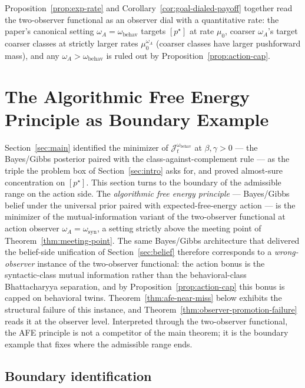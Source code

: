 \documentclass[11pt]{article}
\theoremstyle{definition}
\theoremstyle{remark}
\begin{document}
Proposition~\ref{prop:exp-rate} and Corollary~\ref{cor:goal-dialed-payoff} together read the two-observer functional as an observer dial with a quantitative rate: the paper's canonical setting $\omega_A=\omega_{\mathrm{behav}}$ targets $[p^\star]$ at rate $\mu_0$, coarser $\omega_A$'s target coarser classes at strictly larger rates $\mu_0^{\omega_A}$ (coarser classes have larger pushforward mass), and any $\omega_A>\omega_{\mathrm{behav}}$ is ruled out by Proposition~\ref{prop:action-cap}.

\section{The Algorithmic Free Energy Principle as Boundary Example}
\label{sec:boundary-example}
\label{sec:near-miss}

Section~\ref{sec:main} identified the minimizer of $\mathcal J_t^{\omega_{\mathrm{behav}}}$ at $\beta,\gamma>0$ --- the Bayes/Gibbs posterior paired with the class-against-complement rule --- as the triple the problem box of Section~\ref{sec:intro} asks for, and proved almost-sure concentration on $[p^\star]$. This section turns to the boundary of the admissible range on the action side. The \emph{algorithmic free energy principle} --- Bayes/Gibbs belief under the universal prior paired with expected-free-energy action --- is the minimizer of the mutual-information variant of the two-observer functional at action observer $\omega_A=\omega_{\mathrm{syn}}$, a setting strictly above the meeting point of Theorem~\ref{thm:meeting-point}. The same Bayes/Gibbs architecture that delivered the belief-side unification of Section~\ref{sec:belief} therefore corresponds to a \emph{wrong-observer} instance of the two-observer functional: the action bonus is the syntactic-class mutual information rather than the behavioral-class Bhattacharyya separation, and by Proposition~\ref{prop:action-cap} this bonus is capped on behavioral twins. Theorem~\ref{thm:afe-near-miss} below exhibits the structural failure of this instance, and Theorem~\ref{thm:observer-promotion-failure} reads it at the observer level. Interpreted through the two-observer functional, the AFE principle is not a competitor of the main theorem; it is the boundary example that fixes where the admissible range ends.

\subsection{Boundary identification}
\label{sec:boundary-identification}
\end{document}
